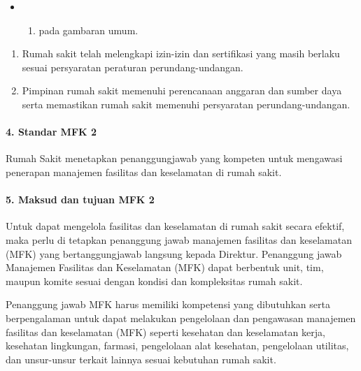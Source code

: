 \documentclass[
]{book}
\providecommand{\tightlist}{%
  \setlength{\itemsep}{0pt}\setlength{\parskip}{0pt}}
\begin{document}
\begin{itemize}
\item
  \begin{enumerate}
  \def\labelenumi{\alph{enumi})}
  \setcounter{enumi}{9}
  \tightlist
  \item
    pada gambaran umum.
  \end{enumerate}
\end{itemize}

\begin{enumerate}
\def\labelenumi{\alph{enumi}.}
\setcounter{enumi}{1}
\tightlist
\item
  Rumah sakit telah melengkapi izin-izin dan sertifikasi yang masih berlaku sesuai persyaratan peraturan perundang-undangan.
\item
  Pimpinan rumah sakit memenuhi perencanaan anggaran dan sumber daya serta memastikan rumah sakit memenuhi persyaratan perundang-undangan.
\end{enumerate}

\hypertarget{standar-mfk-2}{%
\paragraph*{4. Standar MFK 2}\label{standar-mfk-2}}

Rumah Sakit menetapkan penanggungjawab yang kompeten untuk mengawasi penerapan manajemen fasilitas dan keselamatan di rumah sakit.

\hypertarget{maksud-dan-tujuan-mfk-2}{%
\paragraph*{5. Maksud dan tujuan MFK 2}\label{maksud-dan-tujuan-mfk-2}}

Untuk dapat mengelola fasilitas dan keselamatan di rumah sakit secara efektif, maka perlu di tetapkan penanggung jawab manajemen fasilitas dan keselamatan (MFK) yang bertanggungjawab langsung kepada Direktur. Penanggung jawab Manajemen Fasilitas dan Keselamatan (MFK) dapat berbentuk unit, tim, maupun komite sesuai dengan kondisi dan kompleksitas rumah sakit.

Penanggung jawab MFK harus memiliki kompetensi yang dibutuhkan serta berpengalaman untuk dapat melakukan pengelolaan dan pengawasan manajemen fasilitas dan keselamatan (MFK) seperti kesehatan dan keselamatan kerja, kesehatan lingkungan, farmasi, pengelolaan alat kesehatan, pengelolaan utilitas, dan unsur-unsur terkait lainnya sesuai kebutuhan rumah sakit.
\end{document}
